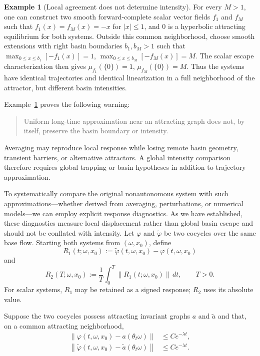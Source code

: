\documentclass[pdflatex,sn-mathphys-num]{sn-jnl}
\numberwithin{equation}{section}
\theoremstyle{thmstyleone}%
\theoremstyle{definition}
\newtheorem{example}[theorem]{Example}
\theoremstyle{remark}
\begin{document}
\begin{example}[Local agreement does not determine intensity]
\label{ex:local-agreement-global-intensity}
For every $M > 1$, one can construct two smooth forward-complete scalar vector fields $f_1$ and $f_M$ such that $f_1(x) = f_M(x) = -x$ for $|x| \leq 1$, and $0$ is a hyperbolic attracting equilibrium for both systems. Outside this common neighborhood, choose smooth extensions with right basin boundaries $b_1, b_M > 1$ such that $\max_{0 \leq x \leq b_1} [-f_1(x)] = 1$,   $\max_{0 \leq x \leq b_M} [-f_M(x)] = M$. The scalar escape characterization then gives $\mu_{f_1}(\{0\}) = 1$,  $\mu_{f_M}(\{0\}) = M$. Thus the systems have identical trajectories and identical linearization in a full neighborhood of the attractor, but different basin intensities.
\end{example}

Example~\ref{ex:local-agreement-global-intensity} proves the following warning:
\begin{quote}
Uniform long-time approximation near an attracting graph does not, by itself, preserve the basin boundary or intensity.
\end{quote}
Averaging may reproduce local response while losing remote basin geometry, transient barriers, or alternative attractors. A global intensity comparison therefore requires global trapping or basin hypotheses in addition to trajectory approximation.

To systematically compare the original nonautonomous system with such approximations---whether derived from averaging, perturbations, or numerical models---we can employ explicit response diagnostics. As we have established, these diagnostics measure local displacement rather than global basin escape and should not be conflated with intensity. Let $\varphi$ and $\widetilde\varphi$ be two cocycles over the same base flow. Starting both systems from $(\omega,x_0)$, define
\[
    R_1(t;\omega,x_0)
    :=
    \widetilde\varphi(t,\omega,x_0)
    -
    \varphi(t,\omega,x_0)
\]
and
\[
    R_2(T;\omega,x_0)
    :=
    \frac1T
    \int_0^T
    \|R_1(t;\omega,x_0)\|\,dt,
    \qquad T>0.
\]
For scalar systems, $R_1$ may be retained as a signed response; $R_2$ uses its absolute value.

Suppose the two cocycles possess attracting invariant graphs $a$ and $\widetilde a$ and that, on a common attracting neighborhood, 
\begin{align}
\label{eq:first-graph-exponential-tracking}
    \left\|
    \varphi(t,\omega,x_0)-a(\theta_t\omega)
    \right\|
    &\leq
    C e^{-\lambda t},\\
\label{eq:second-graph-exponential-tracking}
    \left\|
    \widetilde\varphi(t,\omega,x_0)
    -
    \widetilde a(\theta_t\omega)
    \right\|
    &\leq
    C e^{-\lambda t}.
\end{align}
\end{document}
